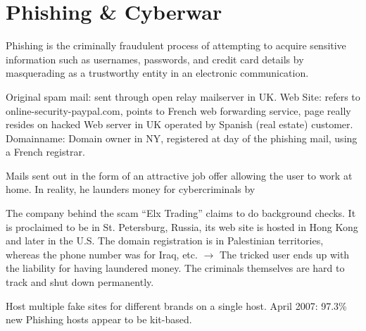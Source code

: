 \section{Phishing \& Cyberwar}

 Phishing is the criminally fraudulent process of attempting to acquire sensitive information such as usernames, passwords, and credit card details by masquerading as a trustworthy entity in an electronic communication.

 Original spam mail: sent through open relay mailserver in UK. Web Site: refers to online-security-paypal.com, points to French web forwarding service, page really resides on hacked Web server in UK operated by Spanish (real estate) customer. Domainname: Domain owner in NY, registered at day of the phishing mail, using a French registrar.

 Mails sent out in the form of an attractive job offer allowing the user to work at home. In reality, he launders money for cybercriminals by

The company behind the scam ``Elx Trading'' claims to do background checks. It is proclaimed to be in St. Petersburg, Russia, its web site is hosted in Hong Kong and later in the U.S. The domain registration is in Palestinian territories, whereas the phone number was for Iraq, etc. $\to$ The tricked user ends up with the liability for having laundered money. The criminals themselves are hard to track and shut down permanently.

 Host multiple fake sites for different brands on a single host. April 2007: 97.3\% new Phishing hosts appear to be kit-based.


